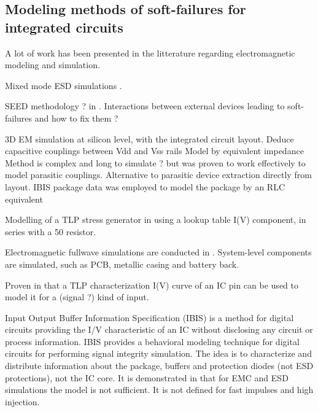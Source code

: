 
\subsection{Modeling methods of soft-failures for integrated circuits}

A lot of work has been presented in the litterature regarding electromagnetic modeling and simulation.

Mixed mode ESD simulations \cite{mixedModeESDSims}.

SEED methodology ? in \cite{usb2ESDProtection}.
Interactions between external devices leading to soft-failures and how to fix them ?

3D EM simulation \cite{LacrampeTransientImmunity} at silicon level, with the integrated circuit layout.
Deduce capacitive couplings between Vdd and Vss rails
Model by equivalent impedance
Method is complex and long to simulate ? but was proven to work effectively to model parasitic couplings.
Alternative to parasitic device extraction directly from layout.
IBIS package data was employed to model the package by an RLC equivalent

%
Modelling of a TLP stress generator in \cite{LacrampeTransientImmunity} using a lookup table I(V) component, in series with a 50\textOmega{} resistor.

Electromagnetic fullwave simulations are conducted in \cite{softFailMobile}.
System-level components are simulated, such as PCB, metallic casing and battery back.

Proven in \cite{usb2ESDProtection} that a TLP characterization I(V) curve of an IC pin can be used to model it for a (signal ?) kind of input.

Input Output Buffer Information Specification (IBIS) \cite{ibis-spec} is a method for digital circuits providing the I/V characteristic of an IC without disclosing any circuit or process information.
IBIS provides a behavioral modeling technique for digital circuits for performing signal integrity simulation.
The idea is to characterize and distribute information about the package, buffers and protection diodes (not ESD protections), not the IC core.
It is demonstrated in \cite{ibisImprovementFabrice} that for EMC and ESD simulations the model is not sufficient.
It is not defined for fast impulses and high injection.
